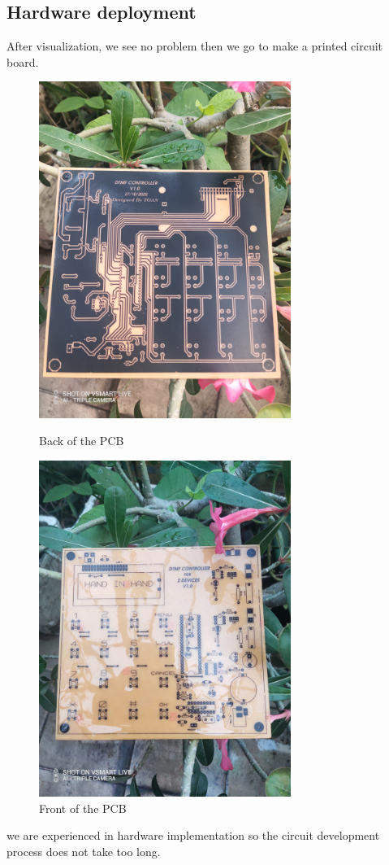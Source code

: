 \documentclass[a4paper]{article}
\begin{document}
\subsection{Hardware deployment}
After visualization, we see no problem then we go to make a printed circuit board.
\begin{figure}[h!]
\centering
\includegraphics[width=8.2cm]{images/back.jpg}
\caption*{Back of the PCB}
\includegraphics[width=8.2cm]{images/front.jpg}
\caption*{Front of the PCB}
\end{figure}
\newpage
\noindent
we are experienced in hardware implementation so the circuit development process does not take too long.
\end{document}
